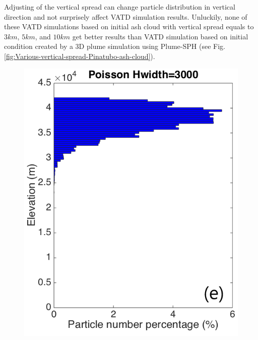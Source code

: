 \documentclass[draft,linenumbers]{agujournal2019}
\begin{document}
Adjusting of the vertical spread can change particle distribution in vertical direction and not surprisely affect VATD simulation results. Unluckily, none of these VATD simulations based on initial ash cloud with vertical spread equals to $3km$, $5km$, and $10 km$ get better results than VATD simulation based on initial condition created by a 3D plume simulation using Plume-SPH (see Fig. \ref{fig:Various-vertical-spread-Pinatubo-ash-cloud}).

\begin{figure}[!htb]
    \centering
    \begin{minipage}{.325 \textwidth}
        \centering
        \includegraphics[width=0.99 \textwidth]{Figures/Possion-Hwidth3k-ParticleDis-z}
    \end{minipage}%
    \begin{minipage}{.325 \textwidth}
        \centering

\end{minipage}
\end{figure}
\end{document}
